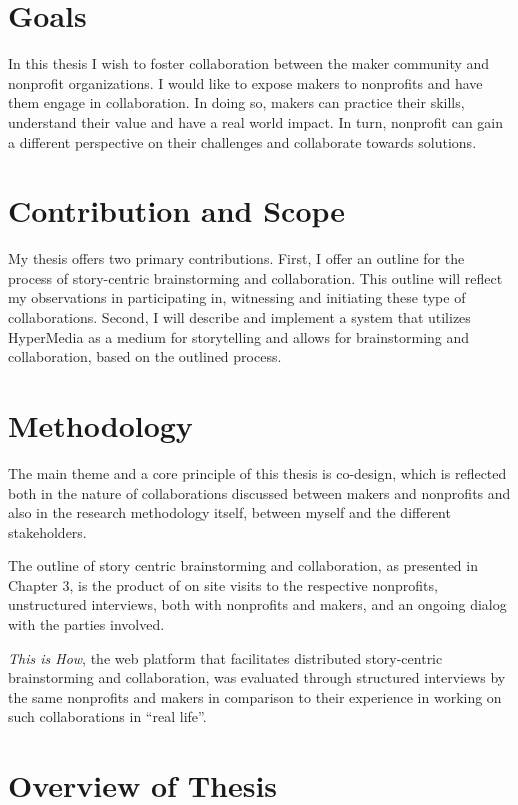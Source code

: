 \section{Goals}
In this thesis I wish to foster collaboration between the maker community and nonprofit organizations. I would like to expose makers to nonprofits and have them engage in collaboration. In doing so, makers can practice their skills, understand their value and have a real world impact. In turn, nonprofit can gain a different perspective on their challenges and collaborate towards solutions. 

\section{Contribution and Scope}
My thesis offers two primary contributions. First, I offer an outline for the process of story-centric brainstorming and collaboration. This outline will reflect my observations in participating in, witnessing and initiating these type of collaborations. Second, I will describe and implement a system that utilizes HyperMedia as a medium for storytelling and allows for brainstorming and collaboration, based on the outlined process. 

\section{Methodology} 
The main theme and a core principle of this thesis is co-design, which is reflected both in the nature of collaborations discussed between makers and nonprofits and also in the research methodology itself, between myself and the different stakeholders. 

The outline of story centric brainstorming and collaboration, as presented in Chapter 3, is the product of on site visits to the respective nonprofits, unstructured interviews, both with nonprofits and makers, and an ongoing dialog with the parties involved. 

\textit{This is How}, the web platform that facilitates distributed story-centric brainstorming and collaboration, was evaluated through structured interviews by the same nonprofits and makers in comparison to their experience in working on such collaborations in ``real life''. 

\section{Overview of Thesis}

